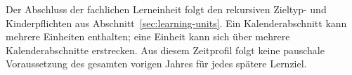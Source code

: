 Der Abschluss der fachlichen Lerneinheit folgt den rekursiven Zieltyp- und
Kinderpflichten aus Abschnitt~\ref{sec:learning-units}. Ein Kalenderabschnitt
kann mehrere Einheiten enthalten; eine Einheit kann sich über mehrere
Kalenderabschnitte erstrecken. Aus diesem Zeitprofil folgt keine pauschale
Voraussetzung des gesamten vorigen Jahres für jedes spätere Lernziel.

